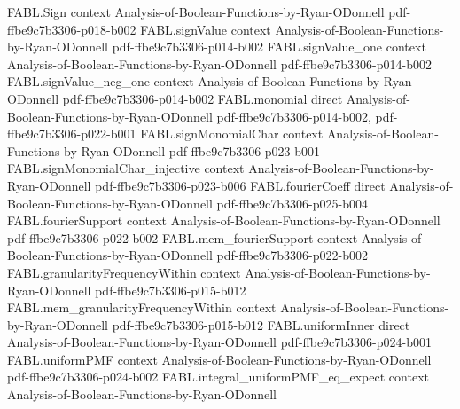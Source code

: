 \begin{theorem}
\label{FABL.productInfluence_uniformSign_eq_influence}
\leanok
{}
\proofstep
  {FABL.Sign}
  {context}
  {Analysis-of-Boolean-Functions-by-Ryan-ODonnell}
  {pdf-ffbe9c7b3306-p018-b002}
\proofstep
  {FABL.signValue}
  {context}
  {Analysis-of-Boolean-Functions-by-Ryan-ODonnell}
  {pdf-ffbe9c7b3306-p014-b002}
\proofstep
  {FABL.signValue_one}
  {context}
  {Analysis-of-Boolean-Functions-by-Ryan-ODonnell}
  {pdf-ffbe9c7b3306-p014-b002}
\proofstep
  {FABL.signValue_neg_one}
  {context}
  {Analysis-of-Boolean-Functions-by-Ryan-ODonnell}
  {pdf-ffbe9c7b3306-p014-b002}
\proofstep
  {FABL.monomial}
  {direct}
  {Analysis-of-Boolean-Functions-by-Ryan-ODonnell}
  {pdf-ffbe9c7b3306-p014-b002,
    pdf-ffbe9c7b3306-p022-b001}
\proofstep
  {FABL.signMonomialChar}
  {context}
  {Analysis-of-Boolean-Functions-by-Ryan-ODonnell}
  {pdf-ffbe9c7b3306-p023-b001}
\proofstep
  {FABL.signMonomialChar_injective}
  {context}
  {Analysis-of-Boolean-Functions-by-Ryan-ODonnell}
  {pdf-ffbe9c7b3306-p023-b006}
\proofstep
  {FABL.fourierCoeff}
  {direct}
  {Analysis-of-Boolean-Functions-by-Ryan-ODonnell}
  {pdf-ffbe9c7b3306-p025-b004}
\proofstep
  {FABL.fourierSupport}
  {context}
  {Analysis-of-Boolean-Functions-by-Ryan-ODonnell}
  {pdf-ffbe9c7b3306-p022-b002}
\proofstep
  {FABL.mem_fourierSupport}
  {context}
  {Analysis-of-Boolean-Functions-by-Ryan-ODonnell}
  {pdf-ffbe9c7b3306-p022-b002}
\proofstep
  {FABL.granularityFrequencyWithin}
  {context}
  {Analysis-of-Boolean-Functions-by-Ryan-ODonnell}
  {pdf-ffbe9c7b3306-p015-b012}
\proofstep
  {FABL.mem_granularityFrequencyWithin}
  {context}
  {Analysis-of-Boolean-Functions-by-Ryan-ODonnell}
  {pdf-ffbe9c7b3306-p015-b012}
\proofstep
  {FABL.uniformInner}
  {direct}
  {Analysis-of-Boolean-Functions-by-Ryan-ODonnell}
  {pdf-ffbe9c7b3306-p024-b001}
\proofstep
  {FABL.uniformPMF}
  {context}
  {Analysis-of-Boolean-Functions-by-Ryan-ODonnell}
  {pdf-ffbe9c7b3306-p024-b002}
\proofstep
  {FABL.integral_uniformPMF_eq_expect}
  {context}
  {Analysis-of-Boolean-Functions-by-Ryan-ODonnell}

\end{theorem}
